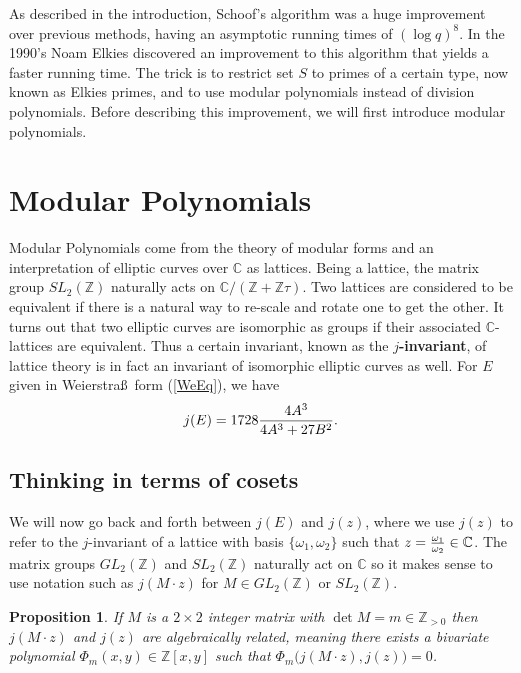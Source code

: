 \documentclass{article}
\newtheorem{Prop}{Proposition}
\newcommand{\C}{\mathbb{C}}
\newcommand{\z}{\mathbb{Z}}
\begin{document}
As described in the introduction, Schoof's algorithm was a huge
improvement over previous methods, having an asymptotic running
times of $(\log q)^8$.  In the 1990's Noam Elkies discovered an
improvement to this algorithm that yields a faster running time. The
trick is to restrict set $S$ to primes of a certain type, now known
as Elkies primes, and to use modular polynomials instead of division
polynomials.  Before describing this improvement, we will first
introduce modular polynomials.

\section{Modular Polynomials}

Modular Polynomials come from the theory of modular forms and an
interpretation of elliptic curves over $\C$ as lattices.  Being a
lattice, the matrix group $SL_2(\z)$ naturally acts on $\C/(\z +
\z\tau)$.  Two lattices are considered to be equivalent if there is a natural way to re-scale
and rotate one to get the other. It turns out that two elliptic
curves are isomorphic as groups if their associated $\C$-lattices
are equivalent.  Thus a certain invariant, known as the {\bf
$j$-invariant}, of lattice theory is in fact an invariant of
isomorphic elliptic curves as well.  For $E$ given in
Weierstra\ss~form (\ref{WeEq}), we have $$j(E) =1728{4A^3 \over 4A^3
+ 27B^2}.$$

\subsection{Thinking in terms of cosets}

We will now go back and forth between $j(E)$ and $j(z)$, where we
use $j(z)$ to refer to the $j$-invariant of a lattice with basis
$\{\omega_1,\omega_2\}$ such that $z = {\omega_1 \over \omega_2} \in
\C$.  The matrix groups $GL_2(\z)$ and $SL_2(\z)$ naturally act on
$\C$ so it makes sense to use notation such as $j(M\cdot z)$ for $M
\in GL_2(\z)$ or $SL_2(\z)$.

\begin{Prop} \cite{Stark}
If $M$ is a $2\times 2$ integer matrix with $\det M = m  \in
\z_{>0}$ then $j(M\cdot z)$ and $j(z)$ are algebraically related,
meaning there exists a bivariate polynomial $\Phi_m(x,y) \in
\z[x,y]$ such that $\Phi_m\bigg(j(M\cdot z), j(z)\bigg) = 0$.
\end{Prop}
\end{document}
